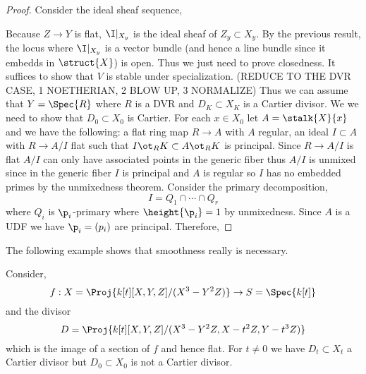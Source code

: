 \documentclass[12pt]{article}
\begin{document}
\begin{proof}
Consider the ideal sheaf sequence,
\begin{center}
\end{center}
Because $Z \to Y$ is flat, $\I|_{X_y}$ is the ideal sheaf of $Z_y \subset X_y$. By the previous result, the locus where $\I|_{X_y}$ is a vector bundle (and hence a line bundle since it embedds in $\struct{X}$) is open. Thus we just need to prove closedness. It suffices to show that $V$ is stable under specialization. 
(REDUCE TO THE DVR CASE, 1 NOETHERIAN, 2 BLOW UP, 3 NORMALIZE)
Thus we can assume that $Y = \Spec{R}$ where $R$ is a DVR and $D_K \subset X_K$ is a Cartier divisor. We we need to show that $D_0 \subset X_0$ is Cartier. For each $x \in X_0$ let $A = \stalk{X}{x}$ and we have the following: a flat ring map $R \to A$ with $A$ regular, an ideal $I \subset A$ with $R \to A/I$ flat such that $I \ot_R K \subset A \ot_R K$ is principal. Since $R \to A/I$ is flat $A/I$ can only have associated  points in the generic fiber thus $A/I$ is unmixed since in the generic fiber $I$ is principal and $A$ is regular so $I$ has no embedded primes by the unmixedness theorem. Consider the primary decomposition, 
\[ I = Q_1 \cap \cdots \cap Q_r \]
where $Q_i$ is $\p_i$-primary where $\height{\p_i} = 1$ by unmixedness. Since $A$ is a UDF we have $\p_i = (p_i)$ are principal. Therefore, 
\end{proof}

\begin{rmk}
The following example shows that smoothness really is necessary. 
\end{rmk}

\begin{example}
Consider,
\[ f : X = \Proj{k[t][X,Y,Z]/(X^3-Y^2Z)} \to S = \Spec{k[t]} \]
and the divisor
\[ D = \Proj{k[t][X,Y,Z]/(X^3 - Y^2 Z, X - t^2 Z, Y - t^3 Z)} \]
which is the image of a section of $f$ and hence flat. For $t \neq 0$ we have $D_t \subset X_t$ a Cartier divisor but $D_0 \subset X_0$ is not a Cartier divisor. 
\end{example}
\end{document}
